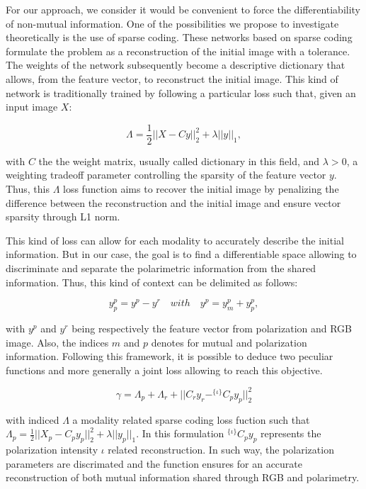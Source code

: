 For our approach, we consider it would be convenient to force the differentiability of non-mutual information.
One of the possibilities we propose to investigate theoretically is the use of sparse coding. These networks based on sparse coding formulate the problem as a reconstruction of the initial image with a tolerance. The weights of the network subsequently become a descriptive dictionary that allows, from the feature vector, to reconstruct the initial image.
This kind of network is traditionally trained by following a particular loss such that, given an input image $X$:

\begin{equation}
	\Lambda = \frac{1}{2} || X - Cy ||^2_2 + \lambda ||y||_1,
\end{equation}

with $C$ the the weight matrix, usually called dictionary in this field, and $\lambda > 0 $, a weighting tradeoff parameter controlling the sparsity of the feature vector $y$. Thus, this $\Lambda$ loss function aims to recover the initial image by penalizing the difference between the reconstruction and the initial image and ensure vector sparsity through L1 norm.

This kind of loss can allow for each modality to accurately describe the initial information. But in our case, the goal is to find a differentiable space allowing to discriminate and separate the polarimetric information from the shared information. Thus, this kind of context can be delimited as follows:

\begin{equation}
	y^p_p = y^p - y^r \quad with \quad y^p = y^p_m + y^p_p,
\end{equation}

with $y^p$ and $y^r$ being respectively the feature vector from polarization and RGB image. Also, the indices $m$ and $p$ denotes for mutual and polarization information.
Following this framework, it is possible to deduce two peculiar functions and more generally a joint loss allowing to reach this objective.

\begin{equation}
	\gamma = \Lambda_p + \Lambda_r + ||C_ry_r - ^{\{\iota\}}C_py_p ||^2_2
\end{equation}

with indiced $\Lambda$ a modality related sparse coding loss fuction such that\\ \mbox{$\Lambda_p = \frac{1}{2} || X_p - C_py_p ||^2_2 + \lambda ||y_p||_1$}. In this formulation $^{\{\iota\}}C_py_p$ represents the polarization intensity $\iota$ related reconstruction. In such way, the polarization parameters are discrimated and the function ensures for an accurate reconstruction of both mutual information shared through RGB and polarimetry.


